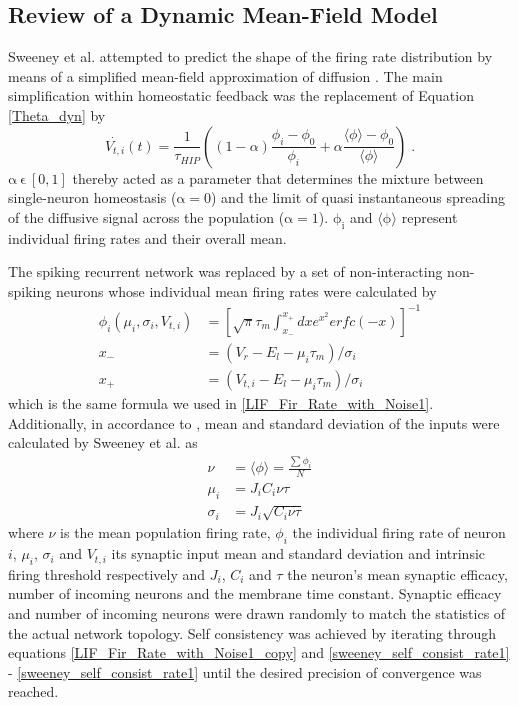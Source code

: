 \documentclass[10pt,a4paper]{article}
\begin{document}
\subsection{Review of a Dynamic Mean-Field Model}\label{Mean_Field_Review_Section}
Sweeney et al. attempted to predict the shape of the firing rate distribution by means of a simplified mean-field approximation of diffusion \cite{Sweeney_Paper}. The main simplification within homeostatic feedback was the replacement of Equation \ref{Theta_dyn} by
\begin{equation}
\dot{V_{t,i}}(t) = \frac{1}{\tau_{HIP}} \left( (1-\alpha)\frac{\phi_i-\phi_0}{\phi_i} +\alpha \frac{\langle \phi \rangle-\phi_0}{\langle \phi \rangle} \right)\;. 
\label{diff_hom_simpl_sweeney}
\end{equation}
$\mathrm{\alpha \: \epsilon \: [0,1]}$ thereby acted as a parameter that determines the mixture between single-neuron homeostasis ($\mathrm{\alpha=0}$) and the limit of quasi instantaneous spreading of the diffusive signal across the population ($\mathrm{\alpha=1}$). $\mathrm{\phi_i}$ and $\mathrm{\mathrm{\langle \phi \rangle}}$ represent individual firing rates and their overall mean.

The spiking recurrent network was replaced by a set of non-interacting non-spiking neurons whose individual mean firing rates were calculated by
\begin{align}
\phi_i(\mu_i,\sigma_i,V_{t,i}) &= \left[ \sqrt{\pi}\tau_m \int_{x_-}^{x_+} dx e^{x^2} erfc(-x) \right]^{-1} \label{LIF_Fir_Rate_with_Noise1_copy}\\
x_- &= (V_r-E_l-\mu_i\tau_m)/\sigma_i \label{LIF_Fir_Rate_with_Noise2_copy}\\
x_+ &= (V_{t,i}-E_l-\mu_i\tau_m)/\sigma_i \label{LIF_Fir_Rate_with_Noise3_copy}
\end{align}
which is the same formula we used in \eqref{LIF_Fir_Rate_with_Noise1}. Additionally, in accordance to \cite{Roxin_Firing_Rate_Distribution}, mean and standard deviation of the inputs were calculated by Sweeney et al. as
\begin{align}
\nu &= \langle \phi \rangle = \frac{\sum \phi_i}{N} \label{sweeney_self_consist_rate1} \\
\mu_i &= J_iC_i\nu \tau \label{sweeney_self_consist_rate2} \\
\sigma_i &= J_i\sqrt{C_i\nu  \tau} \label{sweeney_self_consist_rate3}
\end{align}
where $\nu$ is the mean population firing rate, $\phi_i$ the individual firing rate of neuron $i$, $\mu_i$, $\sigma_i$ and $V_{t,i}$ its synaptic input mean and standard deviation and intrinsic firing threshold respectively and $J_i$, $C_i$ and $\tau$ the neuron's mean synaptic efficacy, number of incoming neurons and the membrane time constant. Synaptic efficacy and number of incoming neurons were drawn randomly to match the statistics of the actual network topology. Self consistency was achieved by iterating through equations \eqref{LIF_Fir_Rate_with_Noise1_copy} and \eqref{sweeney_self_consist_rate1} - \eqref{sweeney_self_consist_rate1} until the desired precision of convergence was reached.
\end{document}
